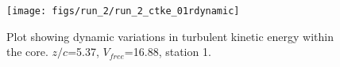 \begin{figure}[H]
\centering
\texttt{[image: figs/run\_2/run\_2\_ctke\_01rdynamic]}
\caption{Plot showing dynamic variations in turbulent kinetic energy within the core. $z/c$=5.37, $V_{free}$=16.88, station 1.}
\label{fig:run_2_ctke_01rdynamic}
\end{figure}


